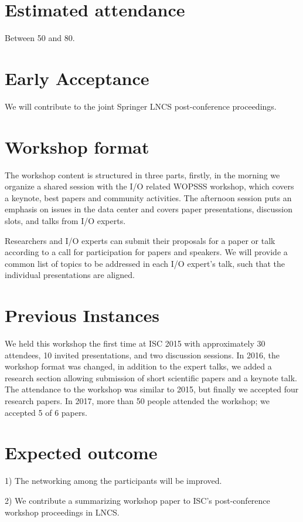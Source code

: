 \documentclass[a4paper,10pt]{article}
\begin{document}
\section{Estimated attendance}
Between 50 and 80.

\section{Early Acceptance}

We will contribute to the joint Springer LNCS post-conference proceedings.


\section{Workshop format}
The workshop content is structured in three parts, firstly, in the morning we organize a shared session with the I/O related WOPSSS workshop, which covers a keynote, best papers and community activities.
The afternoon session puts an emphasis on issues in the data center and covers paper presentations, discussion slots, and talks from I/O experts.

Researchers and I/O experts can submit their proposals for a paper or talk according to a call for participation for papers and speakers.
We will provide a common list of topics to be addressed in each I/O expert's talk, such that the individual presentations are aligned.


\section{Previous Instances}
We held this workshop the first time at ISC 2015 with approximately 30 attendees, 10 invited presentations, and two discussion sessions.
In 2016, the workshop format was changed, in addition to the expert talks, we added a research section allowing submission of short scientific papers and a keynote talk.
The attendance to the workshop was similar to 2015, but finally we accepted four research papers.
In 2017, more than 50 people attended the workshop; we accepted 5 of 6 papers.

\section{Expected outcome}
1) The networking among the participants will be improved.

2) We contribute a summarizing workshop paper to ISC's post-conference workshop proceedings in LNCS.
\end{document}
